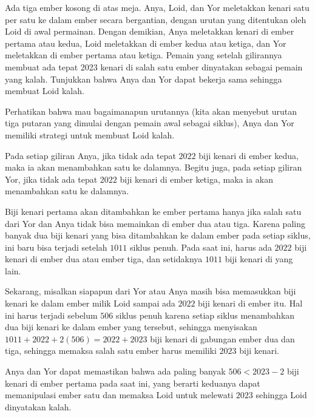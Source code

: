 \documentclass[11pt]{scrartcl}
\begin{document}
\begin{soaljawab}
Ada tiga ember kosong di atas meja. Anya, Loid, dan Yor meletakkan kenari satu per satu ke dalam ember secara bergantian, dengan urutan yang ditentukan oleh Loid di awal permainan. Dengan demikian, Anya meletakkan kenari di ember pertama atau kedua, Loid meletakkan di ember kedua atau ketiga, dan Yor meletakkan di ember pertama atau ketiga. Pemain yang setelah gilirannya membuat ada tepat 2023 kenari di salah satu ember dinyatakan sebagai pemain yang kalah. Tunjukkan bahwa Anya dan Yor dapat bekerja sama sehingga membuat Loid kalah.
    \begin{solusi}
        Perhatikan bahwa mau bagaimanapun urutannya (kita akan menyebut urutan tiga putaran yang dimulai dengan pemain awal sebagai siklus), Anya dan Yor memiliki strategi untuk membuat Loid kalah.
        
        Pada setiap giliran Anya, jika tidak ada tepat $2022$ biji kenari di ember kedua, maka ia akan menambahkan satu ke dalamnya. Begitu juga, pada setiap giliran Yor, jika tidak ada tepat $2022$ biji kenari di ember ketiga, maka ia akan menambahkan satu ke dalamnya. 
        
        Biji kenari pertama akan ditambahkan ke ember pertama hanya jika salah satu dari Yor dan Anya tidak bisa memainkan di ember dua atau tiga. Karena paling banyak dua biji kenari yang bisa ditambahkan ke dalam ember pada setiap siklus, ini baru bisa terjadi setelah $1011$ siklus penuh. Pada saat ini, harus ada $2022$ biji kenari di ember dua atau ember tiga, dan setidaknya $1011$ biji kenari di yang lain. 
        
        Sekarang, misalkan siapapun dari Yor atau Anya masih bisa memasukkan biji kenari ke dalam ember milik Loid sampai ada $2022$ biji kenari di ember itu. Hal ini harus terjadi sebelum $506$ siklus penuh karena setiap siklus menambahkan dua biji kenari ke dalam ember yang tersebut, sehingga menyisakan $1011+2022+2(506)=2022+2023$ biji kenari di gabungan ember dua dan tiga, sehingga memaksa salah satu ember harus memiliki $2023$ biji kenari. 
        
        Anya dan Yor dapat memastikan bahwa ada paling banyak $506<2023-2$ biji kenari di ember pertama pada saat ini, yang berarti keduanya dapat memanipulasi ember satu dan memaksa Loid untuk melewati $2023$ sehingga Loid dinyatakan kalah.
    \end{solusi}
\end{soaljawab}
\end{document}
